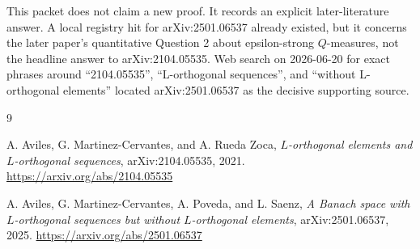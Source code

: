 \documentclass[11pt]{article}
\begin{document}
This packet does not claim a new proof. It records an explicit later-literature
answer. A local registry hit for arXiv:2501.06537 already existed, but it
concerns the later paper's quantitative Question 2 about epsilon-strong
\(Q\)-measures, not the headline answer to arXiv:2104.05535. Web search on
2026-06-20 for exact phrases around ``2104.05535'', ``L-orthogonal sequences'',
and ``without L-orthogonal elements'' located arXiv:2501.06537 as the decisive
supporting source.

\begin{thebibliography}{9}

A. Aviles, G. Martinez-Cervantes, and A. Rueda Zoca,
\emph{\(L\)-orthogonal elements and \(L\)-orthogonal sequences},
arXiv:2104.05535, 2021.
\url{https://arxiv.org/abs/2104.05535}

A. Aviles, G. Martinez-Cervantes, A. Poveda, and L. Saenz,
\emph{A Banach space with \(L\)-orthogonal sequences but without
\(L\)-orthogonal elements},
arXiv:2501.06537, 2025.
\url{https://arxiv.org/abs/2501.06537}

\end{thebibliography}
\end{document}
